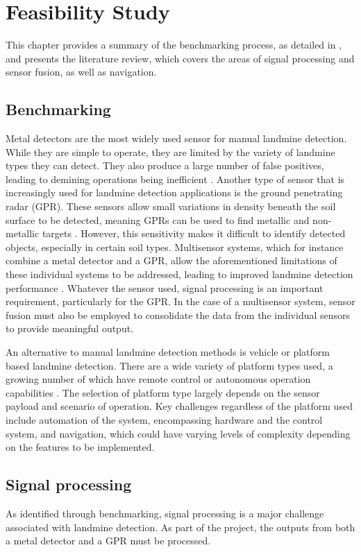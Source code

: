 \documentclass[main.tex]{subfiles}
\begin{document}
\chapter{Feasibility Study}
This chapter provides a summary of the benchmarking process, as detailed in , and presents the literature review, which covers the areas of signal processing and sensor fusion, as well as navigation.

\section{Benchmarking}
Metal detectors are the most widely used sensor for manual landmine detection. While they are simple to operate, they are limited by the variety of landmine types they can detect. They also produce a large number of false positives, leading to demining operations being inefficient \parencite{minelabF3}. Another type of sensor that is increasingly used for landmine detection applications is the ground penetrating radar (GPR). These sensors allow small variations in density beneath the soil surface to be detected, meaning GPRs can be used to find metallic and non-metallic targets \parencite{sakaguchi2014}. However, this sensitivity makes it difficult to identify detected objects, especially in certain soil types. Multisensor systems, which for instance combine a metal detector and a GPR, allow the aforementioned limitations of these individual systems to be addressed, leading to improved landmine detection performance \parencite{Takahashi10}. Whatever the sensor used, signal processing is an important requirement, particularly for the GPR. In the case of a multisensor system, sensor fusion must also be employed to consolidate the data from the individual sensors to provide meaningful output.  

An alternative to manual landmine detection methods is vehicle or platform based landmine detection. There are a wide variety of platform types used, a growing number of which have remote control or autonomous operation capabilities \parencite{portugal2014}. The selection of platform type largely depends on the sensor payload and scenario of operation. Key challenges regardless of the platform used include automation of the system, encompassing hardware and the control system, and navigation, which could have varying levels of complexity depending on the features to be implemented. 

\section{Signal processing}
As identified through benchmarking, signal processing is a major challenge associated with landmine detection. As part of the project, the outputs from both a metal detector and a GPR must be processed. 
\end{document}

